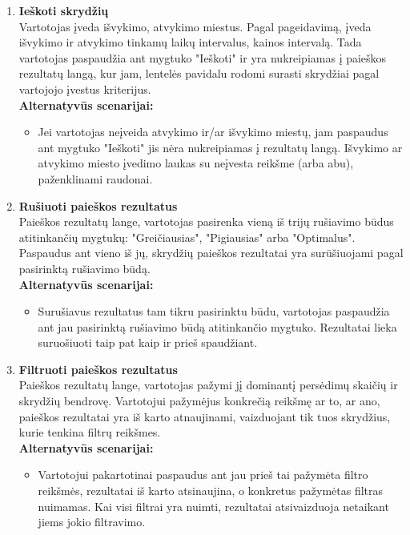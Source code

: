 \documentclass{VUMIFPSkursinis}
\begin{document}
                \begin{enumerate}[label=\textbf{U\arabic*}.]

                    \item \textbf{Ieškoti skrydžių}\\
                    Vartotojas įveda išvykimo, atvykimo miestus. Pagal pageidavimą, įveda išvykimo ir atvykimo tinkamų laikų intervalus, kainos intervalą. Tada vartotojas paspaudžia ant mygtuko "Ieškoti" ir yra nukreipiamas į paieškos rezultatų langą, kur jam, lentelės pavidalu rodomi surasti skrydžiai pagal vartojojo įvestus kriterijus.
                    \\\textbf{Alternatyvūs scenarijai:}
                    \begin{itemize}
                        \item Jei vartotojas neįveida atvykimo ir/ar išvykimo miestų, jam paspaudus ant mygtuko "Ieškoti" jis nėra nukreipiamas į rezultatų langą. Išvykimo ar atvykimo miesto įvedimo laukas su neįvesta reikšme (arba abu), paženklinami raudonai.
                    \end{itemize}

                    \item \textbf{Rušiuoti paieškos rezultatus}\\
                    Paieškos rezultatų lange, vartotojas pasirenka vieną iš trijų rušiavimo būdus atitinkančių mygtukų: "Greičiausias", "Pigiausias" arba "Optimalus". Paspaudus ant vieno iš jų, skrydžių paieškos rezultatai yra surūšiuojami pagal pasirinktą rušiavimo būdą.
                    \\\textbf{Alternatyvūs scenarijai:}
                    \begin{itemize}
                        \item Surušiavus rezultatus tam tikru pasirinktu būdu, vartotojas paspaudžia ant jau pasirinktą rušiavimo būdą atitinkančio mygtuko. Rezultatai lieka suruošiuoti taip pat kaip ir prieš spaudžiant. 
                    \end{itemize}

                    \item \textbf{Filtruoti paieškos rezultatus}\\
                    Paieškos rezultatų lange, vartotojas pažymi jį dominantį persėdimų skaičių ir skrydžių bendrovę. Vartotojui pažymėjus konkrečią reikšmę ar to, ar ano, paieškos rezultatai yra iš karto atnaujinami, vaizduojant tik tuos skrydžius, kurie tenkina filtrų reikšmes.
                    \\\textbf{Alternatyvūs scenarijai:}
                    \begin{itemize}
                        \item Vartotojui pakartotinai paspaudus ant jau prieš tai pažymėta filtro reikšmės, rezultatai iš karto atsinaujina, o konkretus pažymėtas filtras nuimamas. Kai visi filtrai yra nuimti, rezultatai atsivaizduoja netaikant jiems jokio filtravimo.
                    \end{itemize}


\end{enumerate}
\end{document}
